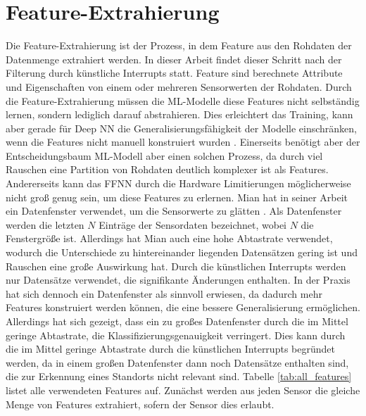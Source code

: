 \section{Feature-Extrahierung}
Die Feature-Extrahierung ist der Prozess, in dem Feature aus den Rohdaten der Datenmenge extrahiert werden.
In dieser Arbeit findet dieser Schritt nach der Filterung durch künstliche Interrupts statt.
Feature sind berechnete Attribute und Eigenschaften von einem oder mehreren Sensorwerten der Rohdaten.
\newline
\newline
Durch die Feature-Extrahierung müssen die ML-Modelle diese Features nicht selbständig lernen, sondern lediglich darauf abstrahieren.
Dies erleichtert das Training, kann aber gerade für Deep NN die Generalisierungsfähigkeit der Modelle einschränken,
wenn die Features nicht manuell konstruiert wurden \cite{seide2011feature}.
Einerseits benötigt aber der Entscheidungsbaum ML-Modell aber einen solchen Prozess,
da durch viel Rauschen eine Partition von Rohdaten deutlich komplexer ist als Features.
Andererseits kann das FFNN durch die Hardware Limitierungen möglicherweise nicht groß genug sein, um diese Features zu erlernen.
\newline
\newline
Mian hat in seiner Arbeit ein Datenfenster verwendet, um die Sensorwerte zu glätten \cite{naveedThesis}.
Als Datenfenster werden die letzten $N$ Einträge der Sensordaten bezeichnet, wobei $N$ die Fenstergröße ist.
Allerdings hat Mian auch eine hohe Abtastrate verwendet, wodurch die Unterschiede zu
hintereinander liegenden Datensätzen gering ist und Rauschen eine große Auswirkung hat.
Durch die künstlichen Interrupts werden nur Datensätze verwendet, die signifikante Änderungen enthalten.
In der Praxis hat sich dennoch ein Datenfenster als sinnvoll erwiesen, da dadurch mehr Features konstruiert werden können,
die eine bessere Generalisierung ermöglichen.
Allerdings hat sich gezeigt, dass ein zu großes Datenfenster durch die im Mittel geringe Abtastrate, die Klassifizierungsgenauigkeit verringert.
Dies kann durch die im Mittel geringe Abtastrate durch die künstlichen Interrupts begründet werden, da in einem großen Datenfenster dann
noch Datensätze enthalten sind, die zur Erkennung eines Standorts nicht relevant sind.
\newline
\newline
Tabelle \ref{tab:all_features} listet alle verwendeten Features auf.
Zunächst werden aus jeden Sensor die gleiche Menge von Features extrahiert, sofern der Sensor dies erlaubt.
